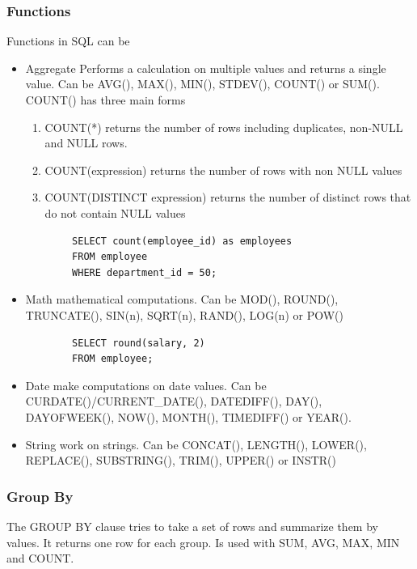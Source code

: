 \subsubsection{Functions}

Functions in SQL can be

\begin{itemize}
    \item Aggregate \ra Performs a calculation on multiple values and returns a single value. Can be AVG(), MAX(), MIN(), STDEV(), COUNT() or SUM(). COUNT() has three main forms
    \begin{enumerate}
        \item COUNT(*) \ra returns the number of rows including duplicates, non-NULL and NULL rows.
        \item COUNT(expression) \ra returns the number of rows with non NULL values
        \item COUNT(DISTINCT expression) \ra returns the number of distinct rows that do not contain NULL values
    \end{enumerate}
    \begin{verbatim}
        SELECT count(employee_id) as employees
        FROM employee
        WHERE department_id = 50;
    \end{verbatim}

    \item Math \ra mathematical computations. Can be MOD(), ROUND(), TRUNCATE(), SIN(n), SQRT(n), RAND(), LOG(n) or POW()
    \begin{verbatim}
        SELECT round(salary, 2)
        FROM employee;
    \end{verbatim} 

    \item Date \ra make computations on date values. Can be CURDATE()/CURRENT\_DATE(), DATEDIFF(), DAY(), DAYOFWEEK(), NOW(), MONTH(), TIMEDIFF() or YEAR().
    
    \item String \ra work on strings. Can be CONCAT(), LENGTH(), LOWER(), REPLACE(), SUBSTRING(), TRIM(), UPPER() or INSTR()

\end{itemize}

\subsubsection{Group By}

The GROUP BY clause tries to take a set of rows and summarize them by values. It returns one row for each group. Is used with SUM, AVG, MAX, MIN and COUNT.

